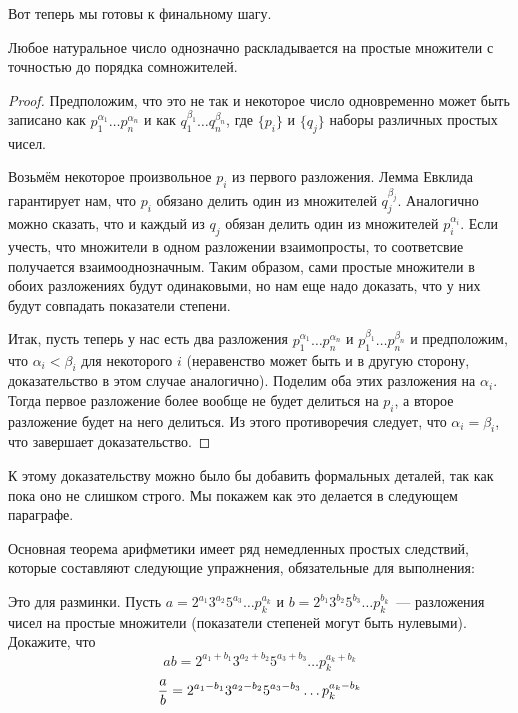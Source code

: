 Вот теперь мы готовы к финальному шагу.

\begin{FTA}
Любое натуральное число однозначно раскладывается на простые множители с точностью до порядка сомножителей.
\end{FTA}
\begin{proof}
Предположим, что это не так и некоторое число одновременно может быть записано как $p_1^{\alpha_1}\ldots p_n^{\alpha_n}$ и как $q_1^{\beta_1}\ldots q_n^{\beta_n}$, где $\{p_i\}$ и $\{q_j\}$ наборы различных простых чисел.

Возьмём некоторое произвольное $p_i$ из первого разложения. Лемма Евклида гарантирует нам, что $p_i$ обязано делить один из множителей $q_j^{\beta_j}$. Аналогично можно сказать, что и каждый из $q_j$ обязан делить один из множителей $p_i^{\alpha_i}$. Если учесть, что множители в одном разложении взаимопросты, то соответсвие получается взаимооднозначным. Таким образом, сами простые множители в обоих разложениях будут одинаковыми, но нам еще надо доказать, что у них будут совпадать показатели степени.

Итак, пусть теперь у нас есть два разложения $p_1^{\alpha_1}\ldots p_n^{\alpha_n}$ и $p_1^{\beta_1}\ldots p_n^{\beta_n}$ и предположим, что $\alpha_i < \beta_i$ для некоторого $i$ (неравенство может быть и в другую сторону, доказательство в этом случае аналогично). Поделим оба этих разложения на $\alpha_i$. Тогда первое разложение более вообще не будет делиться на $p_i$, а второе разложение будет на него делиться. Из этого противоречия следует, что $\alpha_i=\beta_i$, что завершает доказательство.
\end{proof}

К этому доказательству можно было бы добавить формальных деталей, так как пока оно не слишком строго. Мы покажем как это делается в следующем параграфе.

Основная теорема арифметики имеет ряд немедленных простых следствий, которые составляют следующие упражнения, обязательные для выполнения:

\begin{exercise}
Это для разминки. Пусть $a = 2^{a_1}3^{a_2}5^{a_3}\ldots p_k^{a_k}$ и $b = 2^{b_1}3^{b_2}5^{b_3}\ldots p_k^{b_k}$~--- разложения чисел на простые множители (показатели степеней могут быть нулевыми). Докажите, что
$$ab = 2^{a_1+b_1}3^{a_2+b_2}5^{a_3+b_3}\ldots p_k^{a_k+b_k}$$
$${a\over b} = 2^{a_1-b_1}3^{a_2-b_2}5^{a_3-b_3}\ldots p_k^{a_k-b_k}$$
\end{exercise}

